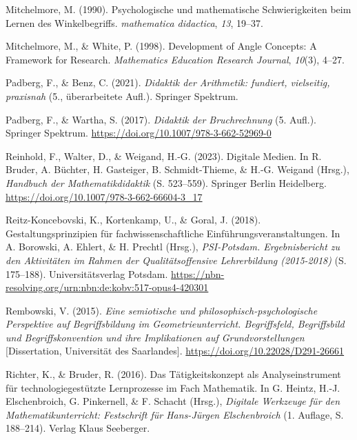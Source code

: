 \documentclass[
]{scrbook}
\newlength{\cslhangindent}
\newenvironment{CSLReferences}[2] %
 {\begin{list}{}{%
  \setlength{\itemindent}{0pt}
  \setlength{\leftmargin}{0pt}
  \setlength{\parsep}{0pt}
  \ifodd #1
   \setlength{\leftmargin}{\cslhangindent}
   \setlength{\itemindent}{-1\cslhangindent}
  \fi
  \setlength{\itemsep}{#2\baselineskip}}}
 {\end{list}}
\theoremstyle{definition}
\theoremstyle{definition}
\theoremstyle{definition}
\theoremstyle{definition}
\theoremstyle{remark}
\begin{document}
\begin{CSLReferences}{1}{0}
Mitchelmore, M. (1990). Psychologische und mathematische Schwierigkeiten beim Lernen des Winkelbegriffs. \emph{mathematica didactica}, \emph{13}, 19--37.

Mitchelmore, M., \& White, P. (1998). Development of {Angle} {Concepts}: {A} {Framework} for {Research}. \emph{Mathematics Education Research Journal}, \emph{10}(3), 4--27.

Padberg, F., \& Benz, C. (2021). \emph{Didaktik der {Arithmetik}: fundiert, vielseitig, praxisnah} (5., überarbeitete Aufl.). Springer Spektrum.

Padberg, F., \& Wartha, S. (2017). \emph{Didaktik der {Bruchrechnung}} (5. Aufl.). Springer Spektrum. \url{https://doi.org/10.1007/978-3-662-52969-0}

Reinhold, F., Walter, D., \& Weigand, H.-G. (2023). Digitale {Medien}. In R. Bruder, A. Büchter, H. Gasteiger, B. Schmidt-Thieme, \& H.-G. Weigand (Hrsg.), \emph{Handbuch der {Mathematikdidaktik}} (S. 523--559). Springer Berlin Heidelberg. \url{https://doi.org/10.1007/978-3-662-66604-3_17}

Reitz-Koncebovski, K., Kortenkamp, U., \& Goral, J. (2018). Gestaltungsprinzipien für fachwissenschaftliche {Einführungsveranstaltungen}. In A. Borowski, A. Ehlert, \& H. Prechtl (Hrsg.), \emph{{PSI}-{Potsdam}. {Ergebnisbericht} zu den {Aktivitäten} im {Rahmen} der {Qualitätsoffensive} {Lehrerbildung} (2015-2018)} (S. 175--188). Universitätsverlag Potsdam. \url{https://nbn-resolving.org/urn:nbn:de:kobv:517-opus4-420301}

Rembowski, V. (2015). \emph{Eine semiotische und philosophisch-psychologische {Perspektive} auf {Begriffsbildung} im {Geometrieunterricht}. {Begriffsfeld}, {Begriffsbild} und {Begriffskonvention} und ihre {Implikationen} auf {Grundvorstellungen}} {[}Dissertation, Universität des Saarlandes{]}. \url{https://doi.org/10.22028/D291-26661}

Richter, K., \& Bruder, R. (2016). Das {Tätigkeitskonzept} als {Analyseinstrument} für technologiegestützte {Lernprozesse} im {Fach} {Mathematik}. In G. Heintz, H.-J. Elschenbroich, G. Pinkernell, \& F. Schacht (Hrsg.), \emph{Digitale {Werkzeuge} für den {Mathematikunterricht}: {Festschrift} für {Hans}-{Jürgen} {Elschenbroich}} (1. Auflage, S. 188--214). Verlag Klaus Seeberger.


\end{CSLReferences}
\end{document}
